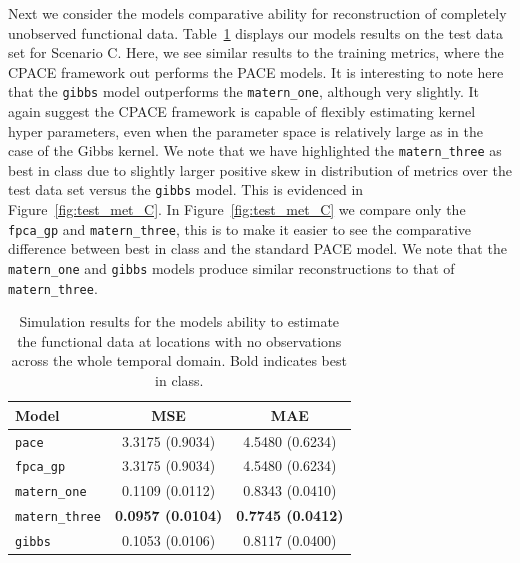 Next we consider the models comparative ability for reconstruction of completely unobserved functional data.
Table~\ref{tab:test_C} displays our models results on the test data set for Scenario C.
Here, we see similar results to the training metrics, where the CPACE framework out performs the PACE models.
It is interesting to note here that the \verb*|gibbs| model outperforms the \verb*|matern_one|, although very slightly.
It again suggest the CPACE framework is capable of flexibly estimating kernel hyper parameters, even when the parameter space is relatively large as in the case of the Gibbs kernel.
We note that we have highlighted the \verb*|matern_three| as best in class due to slightly larger positive skew in distribution of metrics over the test data set versus the \verb*|gibbs| model. 
This is evidenced in Figure~\ref{fig:test_met_C}.
In Figure~\ref{fig:test_met_C} we compare only the \verb*|fpca_gp| and \verb*|matern_three|, this is to make it easier to see the comparative difference between best in class and the standard PACE model.
We note that the \verb*|matern_one| and \verb*|gibbs| models produce similar reconstructions to that of \verb*|matern_three|.

\begin{table}
	\caption[Simulation results for Scenario C on test data]{Simulation results for the models ability to estimate the functional data at locations with no observations across the whole temporal domain. Bold indicates best in class.}
	\centering
	\label{tab:test_C}
	\begin{tabular}{lcc}
		\toprule
		\textbf{Model} & \textbf{MSE} & \textbf{MAE} \\
		\midrule
		\verb*|pace| & 3.3175 (0.9034) & 4.5480	(0.6234) \\
		\verb*|fpca_gp| & 3.3175 (0.9034) & 4.5480	(0.6234)  \\
		\verb*|matern_one| & 0.1109	(0.0112) & 0.8343 (0.0410) \\
		\verb*|matern_three| & \textbf{0.0957 (0.0104)} & \textbf{0.7745 (0.0412)} \\
		\verb*|gibbs| & 0.1053 (0.0106) & 0.8117 (0.0400)\\
		\bottomrule
	\end{tabular}
\end{table}

